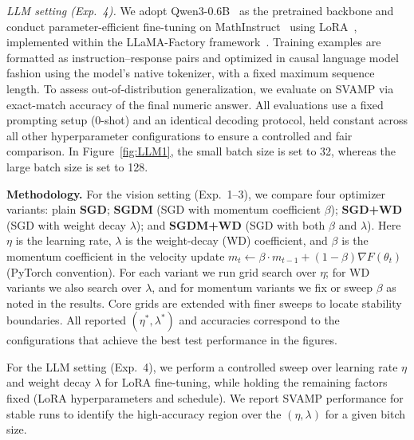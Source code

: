 \emph{LLM setting (Exp.~4).}
We adopt Qwen3-0.6B~\cite{qwen3} as the pretrained backbone and conduct parameter-efficient fine-tuning on MathInstruct~\cite{yue2023mammoth} using LoRA~\cite{hu2021loralowrankadaptationlarge}, implemented within the LLaMA-Factory framework~\cite{zheng2024llamafactory}.
Training examples are formatted as instruction--response pairs and optimized in causal language model fashion using the model's native tokenizer, with a fixed maximum sequence length.
To assess out-of-distribution generalization, we evaluate on SVAMP \citep{patel2021nlp} via exact-match accuracy of the final numeric answer. All evaluations use a fixed prompting setup (0-shot) and an identical decoding protocol, held constant across all other hyperparameter configurations to ensure a controlled and fair comparison.
In Figure~\ref{fig:LLM1}, the small batch size is set to 32, whereas the large batch size is set to 128.

\textbf{Methodology.}
For the vision setting (Exp.~1--3), we compare four optimizer variants: plain \textbf{SGD}; \textbf{SGDM} (SGD with momentum coefficient $\beta$); \textbf{SGD+WD} (SGD with weight decay $\lambda$); and \textbf{SGDM+WD} (SGD with both $\beta$ and $\lambda$). Here $\eta$ is the learning rate, $\lambda$ is the weight-decay (WD) coefficient, and $\beta$ is the momentum coefficient in the velocity update $m_t \leftarrow \beta\cdot m_{t-1} + (1-\beta)\nabla F(\theta_t)$ (PyTorch convention). For each variant we run grid search over $\eta$; for WD variants we also search over $\lambda$, and for momentum variants we fix or sweep $\beta$ as noted in the results. Core grids are extended with finer sweeps to locate stability boundaries. All reported $(\eta^*,\lambda^*)$ and accuracies correspond to the configurations that achieve the best test performance in the figures.

For the LLM setting (Exp.~4), we perform a controlled sweep over learning rate $\eta$ and weight decay $\lambda$ for LoRA fine-tuning, while holding the remaining factors fixed (LoRA hyperparameters and schedule). We report SVAMP performance for stable runs to identify the high-accuracy region over the $(\eta,\lambda)$  for a given bitch size.






